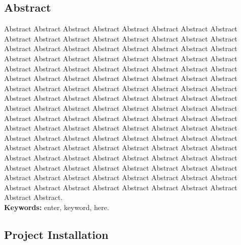 \documentclass[11pt,a4paper]{report}
\begin{document}
\clearpage
 \vspace*{2cm}
\begin{center}\section*{Abstract}\end{center}
\begin{spacing}{1.5}

Abstract Abstract Abstract Abstract Abstract Abstract Abstract Abstract Abstract Abstract Abstract Abstract Abstract Abstract Abstract Abstract Abstract Abstract Abstract Abstract Abstract Abstract Abstract Abstract Abstract Abstract Abstract Abstract Abstract Abstract Abstract Abstract Abstract Abstract Abstract Abstract Abstract Abstract Abstract Abstract Abstract Abstract Abstract Abstract Abstract Abstract Abstract Abstract Abstract Abstract Abstract Abstract Abstract Abstract Abstract Abstract Abstract Abstract Abstract Abstract Abstract Abstract Abstract Abstract Abstract Abstract Abstract Abstract Abstract Abstract Abstract Abstract Abstract Abstract Abstract Abstract Abstract Abstract Abstract Abstract Abstract Abstract Abstract Abstract Abstract Abstract Abstract Abstract Abstract Abstract Abstract Abstract Abstract Abstract Abstract Abstract Abstract Abstract Abstract Abstract Abstract Abstract Abstract Abstract Abstract Abstract Abstract Abstract Abstract Abstract Abstract Abstract Abstract Abstract Abstract Abstract Abstract Abstract Abstract Abstract Abstract Abstract Abstract Abstract Abstract Abstract Abstract Abstract Abstract Abstract Abstract Abstract Abstract Abstract Abstract Abstract Abstract Abstract.\\

{\bf Keywords:} enter, keyword, here.

\end{spacing}
\clearpage

\tableofcontents
\clearpage

\listoffigures
\clearpage

\listoftables
\clearpage
\printacronyms[include=abbrev,name=Abbreviations]


\pagebreak
{}
 
 
 
% 
%        
% 



\begin{appendices}
\chapter{Project Installation}
\end{appendices}

\clearpage
{}
\nocite{*}
 
\end{document}
